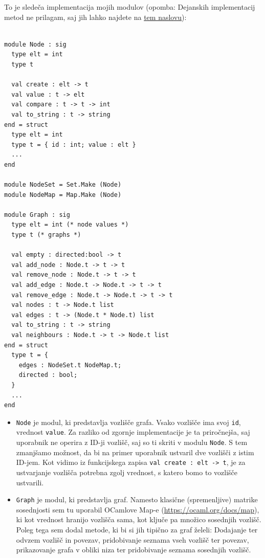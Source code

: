 \documentclass[mat1, tisk]{fmfdelo}
\begin{document}
To je sledeča implementacija mojih modulov (opomba: Dejanskih implementacij metod ne prilagam, saj jih lahko najdete na 
\href{https://github.com/tjazerzen/parallelisation-of-graph-algorithms-in-functional-programming-languages/blob/master/playground/graph/graph.ml}{tem naslovu}):

\begin{lstlisting}

module Node : sig
  type elt = int
  type t

  val create : elt -> t
  val value : t -> elt
  val compare : t -> t -> int
  val to_string : t -> string
end = struct
  type elt = int
  type t = { id : int; value : elt }
  ...
end

module NodeSet = Set.Make (Node)
module NodeMap = Map.Make (Node)

module Graph : sig
  type elt = int (* node values *)
  type t (* graphs *)

  val empty : directed:bool -> t
  val add_node : Node.t -> t -> t
  val remove_node : Node.t -> t -> t
  val add_edge : Node.t -> Node.t -> t -> t
  val remove_edge : Node.t -> Node.t -> t -> t
  val nodes : t -> Node.t list
  val edges : t -> (Node.t * Node.t) list
  val to_string : t -> string
  val neighbours : Node.t -> t -> Node.t list
end = struct
  type t = {
    edges : NodeSet.t NodeMap.t;
    directed : bool;
  }
  ...
end

\end{lstlisting}

\begin{itemize}
  \item \texttt{Node} je modul, ki predstavlja vozlišče grafa. Vsako vozlišče ima svoj \texttt{id}, vrednost \texttt{value}.
        Za razliko od zgornje implementacije je ta priročnejša, saj uporabnik ne operira z ID-ji vozlišč, saj so ti skriti v modulu \texttt{Node}.
        S tem zmanjšamo možnost, da bi na primer uporabnik ustvaril dve vozlišči z istim ID-jem. Kot vidimo iz funkcijskega zapisa
        \texttt{val create : elt -> t}, je za ustvarjanje vozlišča potrebna zgolj vrednost, s katero bomo to vozlišče ustvarili.
  \item \texttt{Graph} je modul, ki predstavlja graf. Namesto klasične (spremenljive) matrike sosednjosti sem tu uporabil OCamlove
        Map-e (\url{https://ocaml.org/docs/map}), ki kot vrednost hranijo vozlišča sama, kot ključe pa množico sosednjih vozlišč.
        Poleg tega sem dodal metode, ki bi si jih tipično za graf želeli: Dodajanje ter odvzem vozlišč in povezav, pridobivanje seznama vseh vozlišč ter povezav,
        prikazovanje grafa v obliki niza ter pridobivanje seznama sosednjih vozlišč.
\end{itemize}
\end{document}
